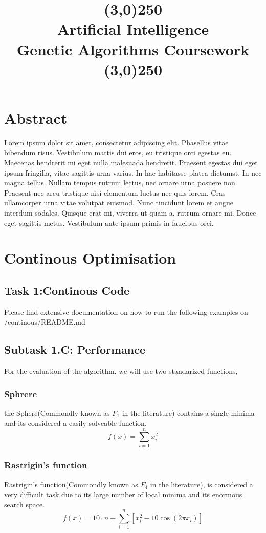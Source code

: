 \documentclass[openany]{article}
\title{\line(3,0){250}\\Artificial Intelligence \\ Genetic Algorithms Coursework  \\\line(3,0){250}}
\begin{document}
	\maketitle
	\pagebreak
	\section{Abstract}
		Lorem ipsum dolor sit amet, consectetur adipiscing elit. Phasellus vitae bibendum risus. Vestibulum mattis dui eros, 
		eu tristique orci egestas eu. Maecenas hendrerit mi eget nulla malesuada hendrerit. Praesent egestas dui eget ipsum fringilla, 
		vitae sagittis urna varius. In hac habitasse platea dictumst. In nec magna tellus. Nullam tempus rutrum lectus, nec ornare urna 
		posuere non. Praesent nec arcu tristique nisi elementum luctus nec quis lorem. Cras ullamcorper urna vitae volutpat euismod. Nunc 
		tincidunt lorem et augue interdum sodales. Quisque erat mi, viverra ut quam a, rutrum ornare mi. Donec eget sagittis metus. 
		Vestibulum ante ipsum primis in faucibus orci. 
	\pagebreak
	\section{Continous Optimisation}
		\subsection{Task 1:Continous Code}
			\begin{note}
				Please find extensive documentation on how to run the following examples on /continous/README.md
			\end{note}
		\subsection{Subtask 1.C: Performance}
			For the evaluation of the algorithm, we will use two standarized functions, 
			\subsubsection{Sphrere}
			the Sphere(Commondly known as $F_{1}$ in the literature\cite{performance}) contains a single minima and its considered a easily solveable function.
			\begin{equation}
			f(x)=\sum_{i=1}^{n}{x_{i}^2}
			\end{equation}
			\subsubsection{Rastrigin's function}
			Rastrigin’s function(Commondly known as $F_{4}$ in the literature\cite{performance}), is considered a very difficult task due to its large number of local minima and its enormous search space.
			\begin{equation}
			f(x)=10\cdot n+\sum_{i=1}^{n}[x_{i}^{2}-10\cos(2\pi x_{i})]
			\end{equation}
\end{document}
